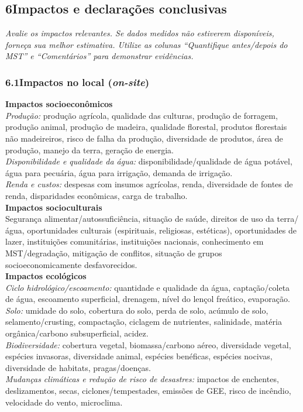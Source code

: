 \subsection*{6\quad Impactos e declarações conclusivas}

\textit{Avalie os impactos relevantes. Se dados medidos não estiverem disponíveis, forneça sua melhor estimativa. Utilize as colunas ``Quantifique antes/depois do MST'' e ``Comentários'' para demonstrar evidências.}

\subsubsection*{6.1\quad Impactos no local (\textit{on-site})}

\noindent\textbf{Impactos socioeconômicos}\\[2pt]
\textit{Produção:} produção agrícola, qualidade das culturas, produção de forragem, produção animal, produção de madeira, qualidade florestal, produtos florestais não madeireiros, risco de falha da produção, diversidade de produtos, área de produção, manejo da terra, geração de energia.\\[4pt]
\textit{Disponibilidade e qualidade da água:} disponibilidade/qualidade de água potável, água para pecuária, água para irrigação, demanda de irrigação.\\[4pt]
\textit{Renda e custos:} despesas com insumos agrícolas, renda, diversidade de fontes de renda, disparidades econômicas, carga de trabalho.\\[6pt]
\noindent\textbf{Impactos socioculturais}\\[2pt]
Segurança alimentar/autossuficiência, situação de saúde, direitos de uso da terra/água, oportunidades culturais (espirituais, religiosas, estéticas), oportunidades de lazer, instituições comunitárias, instituições nacionais, conhecimento em MST/degradação, mitigação de conflitos, situação de grupos socioeconomicamente desfavorecidos.\\[6pt]
\noindent\textbf{Impactos ecológicos}\\[2pt]
\textit{Ciclo hidrológico/escoamento:} quantidade e qualidade da água, captação/coleta de água, escoamento superficial, drenagem, nível do lençol freático, evaporação.\\[4pt]
\textit{Solo:} umidade do solo, cobertura do solo, perda de solo, acúmulo de solo, selamento/crusting, compactação, ciclagem de nutrientes, salinidade, matéria orgânica/carbono subsuperficial, acidez.\\[4pt]
\textit{Biodiversidade:} cobertura vegetal, biomassa/carbono aéreo, diversidade vegetal, espécies invasoras, diversidade animal, espécies benéficas, espécies nocivas, diversidade de habitats, pragas/doenças.\\[4pt]
\textit{Mudanças climáticas e redução de risco de desastres:} impactos de enchentes, deslizamentos, secas, ciclones/tempestades, emissões de GEE, risco de incêndio, velocidade do vento, microclima.

